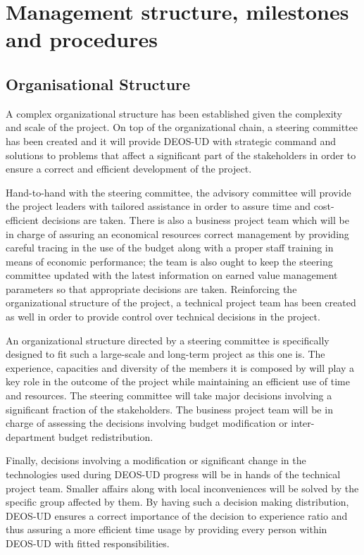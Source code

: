 \section{Management structure, milestones and procedures}

\subsection{Organisational Structure}

A complex organizational structure has been established given the complexity and scale of the project. On top of the organizational chain, a steering committee has been created and it will provide DEOS-UD with strategic command and solutions to problems that affect a significant part of the stakeholders in order to ensure a correct and efficient development of the project.

Hand-to-hand with the steering committee, the advisory committee will provide the project leaders with tailored assistance in order to assure time and cost-efficient decisions are taken. There is also a business project team which will be in charge of assuring an economical resources correct management by providing careful tracing in the use of the budget along with a proper staff training in means of economic performance; the team is also ought to keep the steering committee updated with the latest information on earned value management parameters so that appropriate decisions are taken. Reinforcing the organizational structure of the project, a technical project team has been created as well in order to provide control over technical decisions in the project.

An organizational structure directed by a steering committee is specifically designed to fit such a large-scale and long-term project as this one is. The experience, capacities and diversity of the members it is composed by will play a key role in the outcome of the project while maintaining an efficient use of time and resources. The steering committee will take major decisions involving a significant fraction of the stakeholders. The business project team will be in charge of assessing the decisions involving budget modification or inter-department budget redistribution.

Finally, decisions involving a modification or significant change in the technologies used during DEOS-UD progress will be in hands of the technical project team. Smaller affairs along with local inconveniences will be solved by the specific group affected by them. By having such a decision making distribution, DEOS-UD ensures a correct importance of the decision to experience ratio and thus assuring a more efficient time usage by providing every person within DEOS-UD with fitted responsibilities.


